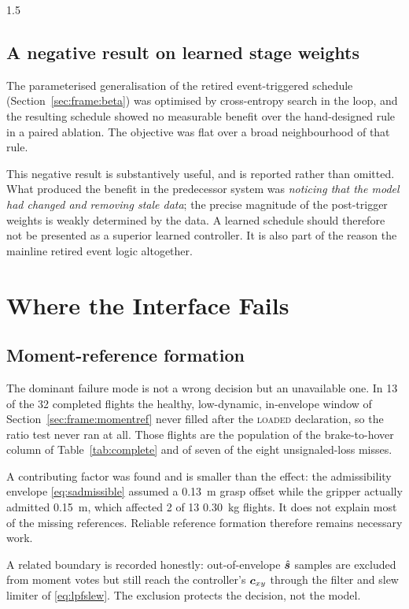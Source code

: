 \begin{spacing}{1.5}
\subsection{A negative result on learned stage weights}\label{sec:eval:weightlearning}

The parameterised generalisation of the retired event-triggered schedule
(Section~\ref{sec:frame:beta}) was optimised by cross-entropy search in the loop,
and the resulting schedule showed no measurable benefit over the hand-designed
rule in a paired ablation. The objective was flat over a broad neighbourhood of
that rule.

This negative result is substantively useful, and is reported rather than
omitted. What produced the benefit in the predecessor system was \emph{noticing
that the model had changed and removing stale data}; the precise magnitude of the
post-trigger weights is weakly determined by the data. A learned schedule should
therefore not be presented as a superior learned controller. It is also part of
the reason the mainline retired event logic altogether.

\section{Where the Interface Fails}\label{sec:eval:limits}

\subsection{Moment-reference formation}\label{sec:eval:refform}

The dominant failure mode is not a wrong decision but an unavailable one. In 13
of the 32 completed flights the healthy, low-dynamic, in-envelope window of
Section~\ref{sec:frame:momentref} never filled after the \textsc{loaded}
declaration, so the ratio test never ran at all. Those flights are the population
of the brake-to-hover column of Table~\ref{tab:complete} and of seven of the
eight unsignaled-loss misses.

A contributing factor was found and is smaller than the effect: the
admissibility envelope \eqref{eq:sadmissible} assumed a \SI{0.13}{\meter} grasp
offset while the gripper actually admitted \SI{0.15}{\meter}, which affected 2 of
13 \SI{0.30}{\kg} flights. It does not explain most of the missing references.
Reliable reference formation therefore remains necessary work.

A related boundary is recorded honestly: out-of-envelope $\hat{\bm{s}}$ samples are
excluded from moment votes but still reach the controller's $\bm{c}_{xy}$ through the
filter and slew limiter of \eqref{eq:lpfslew}. The exclusion protects the
decision, not the model.


\end{spacing}
